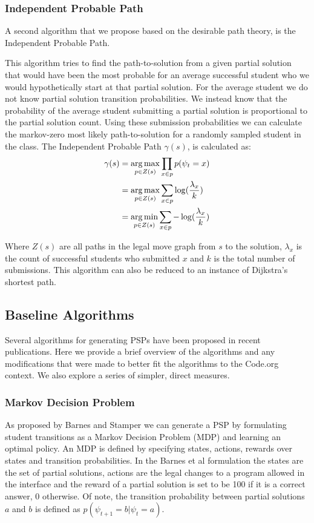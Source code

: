 \subsubsection{Independent Probable Path}
A second algorithm that we propose based on the desirable path theory, is the Independent Probable Path. 

This algorithm tries to find the path-to-solution from a given partial solution that would have been the most probable for an average successful student who we would hypothetically start at that partial solution. For the average student we do not know partial solution transition probabilities. We instead know that the probability of the average student submitting a partial solution is proportional to the partial solution count. Using these submission probabilities we can calculate the markov-zero most likely path-to-solution for a randomly sampled student in the class. The Independent Probable Path $\gamma(s)$, is calculated as:
\begin{align*}
\gamma(s)&=\operatorname*{arg\,max}_{p \in Z(s)}{\prod_{x \in p}{p(\psi_t = x)}} \\
         &=\operatorname*{arg\,max}_{p \in Z(s)}{\sum_{x \in p}{\log(\frac{\lambda_x}{k})}}\\
         &=\operatorname*{arg\,min}_{p \in Z(s)}{\sum_{x \in p}{-\log(\frac{\lambda_x}{k})}}
\end{align*} 


Where $Z(s)$ are all paths in the legal move graph from $s$ to the solution, $\lambda_x$ is the count of successful students who submitted $x$ and $k$ is the total number of submissions. This algorithm can also be reduced to an instance of Dijkstra's shortest path. 

\subsection{Baseline Algorithms}
Several algorithms for generating PSPs have been proposed in recent publications. Here we provide a brief overview of the algorithms and any modifications that were made to better fit the algorithms to the Code.org context. We also explore a series of simpler, direct measures. 

\subsubsection{Markov Decision Problem}
As proposed by Barnes and Stamper we can generate a PSP by formulating student transitions as a Markov Decision Problem (MDP) and learning an optimal policy. An MDP is defined by specifying states, actions, rewards over states and transition probabilities. In the Barnes et al formulation the states are the set of partial solutions, actions are the legal changes to a program allowed in the interface and the reward of a partial solution is set to be 100 if it is a correct answer, 0 otherwise. Of note, the transition probability between partial solutions $a$ and $b$ is defined as $p(\psi_{t+1} = b | \psi_t = a)$.

